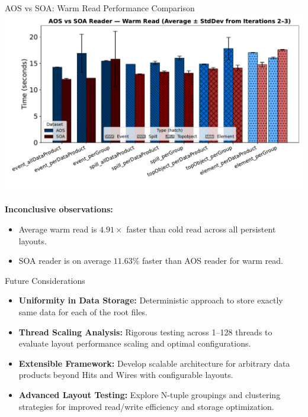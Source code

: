 \documentclass[aspectratio=169]{beamer}
\begin{document}
\begin{frame}{AOS vs SOA: Warm Read Performance Comparison}
  \centering
  \includegraphics[width=0.6\linewidth]{../experiments/Seaborn/AOS_SOA_Reader_Warm_grouped_progressive.pdf}
  
  \textbf{Inconclusive observations:}
  \begin{itemize}
  \item Average warm read is $4.91\times$ faster than cold read across all persistent layouts.
  \item SOA reader is on average $11.63\%$ faster than AOS reader for warm read.
  \end{itemize}
  \end{frame}


\begin{frame}{Future Considerations}
\begin{itemize}

  \item \textbf{Uniformity in Data Storage:} Deterministic approach to store exactly same data for each of the root files.

  \vspace{0.5em}

  \item \textbf{Thread Scaling Analysis:} Rigorous testing across 1--128 threads to evaluate layout performance scaling and optimal configurations.
  
  \vspace{0.5em}
  
  \item \textbf{Extensible Framework:} Develop scalable architecture for arbitrary data products beyond Hits and Wires with configurable layouts.
  
  \vspace{0.5em}
  
  \item \textbf{Advanced Layout Testing:} Explore N-tuple groupings and clustering strategies for improved read/write efficiency and storage optimization.
\end{itemize}
\end{frame}
\end{document}
